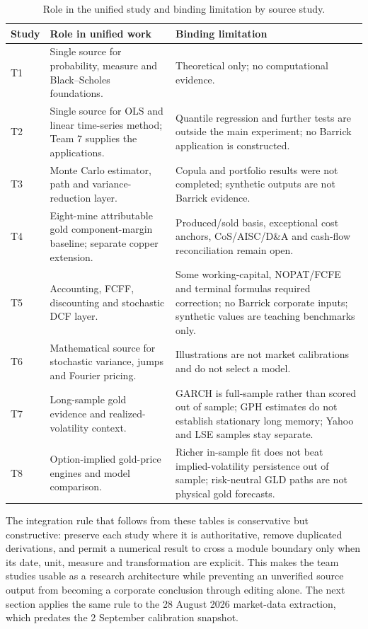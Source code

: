 \begin{table}[H]
\centering
\caption{Role in the unified study and binding limitation by source study.}
\label{tab:team-validation-role}
\scriptsize
\setlength{\tabcolsep}{3pt}
\renewcommand{\arraystretch}{1.10}
\begin{tabularx}{\textwidth}{@{}p{0.85cm}X X@{}}
\toprule
\textbf{Study} & \textbf{Role in unified work} & \textbf{Binding limitation} \\
\midrule
T1 & Single source for probability, measure and Black--Scholes foundations. &
Theoretical only; no computational evidence. \\
T2 & Single source for OLS and linear time-series method; Team 7 supplies the
applications. & Quantile regression and further tests are outside the main
experiment; no Barrick application is constructed. \\
T3 & Monte Carlo estimator, path and variance-reduction layer. & Copula and
portfolio results were not completed; synthetic outputs are not Barrick
evidence. \\
T4 & Eight-mine attributable gold component-margin baseline; separate copper
extension. & Produced/sold basis, exceptional cost anchors, CoS/AISC/D\&A and
cash-flow reconciliation remain open. \\
T5 & Accounting, FCFF, discounting and stochastic DCF layer. & Some
working-capital, NOPAT/FCFE and terminal formulas required correction; no
Barrick corporate inputs; synthetic values are teaching benchmarks only. \\
T6 & Mathematical source for stochastic variance, jumps and Fourier pricing. &
Illustrations are not market calibrations and do not select a model. \\
T7 & Long-sample gold evidence and realized-volatility context. & GARCH is
full-sample rather than scored out of sample; GPH estimates do not establish
stationary long memory; Yahoo and LSE samples stay separate. \\
T8 & Option-implied gold-price engines and model comparison. & Richer in-sample
fit does not beat implied-volatility persistence out of sample; risk-neutral
GLD paths are not physical gold forecasts. \\
\bottomrule
\end{tabularx}
\end{table}

The integration rule that follows from these tables is conservative but
constructive: preserve each study where it is authoritative, remove duplicated
derivations, and permit a numerical result to cross a module boundary only when
its date, unit, measure and transformation are explicit. This makes the team
studies usable as a research architecture while preventing an unverified
source output from becoming a corporate conclusion through editing alone. The
next section applies the same rule to the 28 August 2026 market-data
extraction, which predates the 2 September calibration snapshot.
